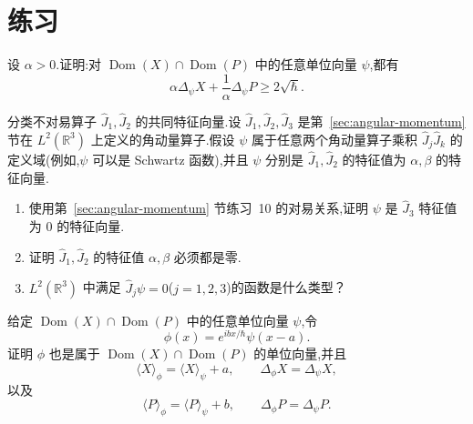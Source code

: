 \section{练习}
\label{sec:chapter12-exercises}

\begin{exercise}[加法形式的不确定性原理]\label{ex:uncertainty-additive}
设 $\alpha>0$.证明:对 $\operatorname{Dom}(X)\cap\operatorname{Dom}(P)$ 中的任意单位向量 $\psi$,都有
\[
\alpha\Delta_\psi X+\frac1\alpha\Delta_\psi P\geq2\sqrt{\hbar}.
\]
\end{exercise}

\begin{exercise}[共同特征向量]\label{ex:uncertainty-joint-eigenvectors}
分类不对易算子 $\widehat J_1,\widehat J_2$ 的共同特征向量.设 $\widehat J_1,\widehat J_2,\widehat J_3$ 是第~\ref{sec:angular-momentum} 节在 $L^2(\mathbb R^3)$ 上定义的角动量算子.假设 $\psi$ 属于任意两个角动量算子乘积 $\widehat J_j\widehat J_k$ 的定义域(例如,$\psi$ 可以是 Schwartz 函数),并且 $\psi$ 分别是 $\widehat J_1,\widehat J_2$ 的特征值为 $\alpha,\beta$ 的特征向量.
\begin{enumerate}
\item 使用第~\ref{sec:angular-momentum} 节练习~10 的对易关系,证明 $\psi$ 是 $\widehat J_3$ 特征值为 $0$ 的特征向量.
\item 证明 $\widehat J_1,\widehat J_2$ 的特征值 $\alpha,\beta$ 必须都是零.
\item $L^2(\mathbb R^3)$ 中满足 $\widehat J_j\psi=0$($j=1,2,3$)的函数是什么类型？
\end{enumerate}
\end{exercise}

\begin{exercise}[平移与调制]\label{ex:uncertainty-translation-modulation}
给定 $\operatorname{Dom}(X)\cap\operatorname{Dom}(P)$ 中的任意单位向量 $\psi$,令
\[
\phi(x)=e^{ibx/\hbar}\psi(x-a).
\]
证明 $\phi$ 也是属于 $\operatorname{Dom}(X)\cap\operatorname{Dom}(P)$ 的单位向量,并且
\[
\langle X\rangle_\phi=\langle X\rangle_\psi+a,
\qquad \Delta_\phi X=\Delta_\psi X,
\]
以及
\[
\langle P\rangle_\phi=\langle P\rangle_\psi+b,
\qquad \Delta_\phi P=\Delta_\psi P.
\]
\end{exercise}

